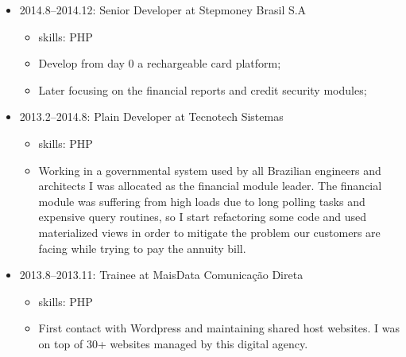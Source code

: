 \documentclass[
]{article}
\providecommand{\tightlist}{%
  \setlength{\itemsep}{0pt}\setlength{\parskip}{0pt}}
\begin{document}
\vspace{2mm}

\begin{itemize}
\tightlist
\item
  2014.8--2014.12: Senior Developer at Stepmoney Brasil S.A

  \begin{itemize}
  \tightlist
  \item
    skills: PHP
  \item
    Develop from day 0 a rechargeable card platform;
  \item
    Later focusing on the financial reports and credit security modules;
  \end{itemize}
\end{itemize}

\vspace{2mm}

\begin{itemize}
\tightlist
\item
  2013.2--2014.8: Plain Developer at Tecnotech Sistemas

  \begin{itemize}
  \tightlist
  \item
    skills: PHP
  \item
    Working in a governmental system used by all Brazilian engineers and
    architects I was allocated as the financial module leader. The
    financial module was suffering from high loads due to long polling
    tasks and expensive query routines, so I start refactoring some code
    and used materialized views in order to mitigate the problem our
    customers are facing while trying to pay the annuity bill.
  \end{itemize}
\end{itemize}

\vspace{2mm}

\begin{itemize}
\tightlist
\item
  2013.8--2013.11: Trainee at MaisData Comunicação Direta

  \begin{itemize}
  \tightlist
  \item
    skills: PHP
  \item
    First contact with Wordpress and maintaining shared host websites. I
    was on top of 30+ websites managed by this digital agency.
  \end{itemize}
\end{itemize}
\end{document}
